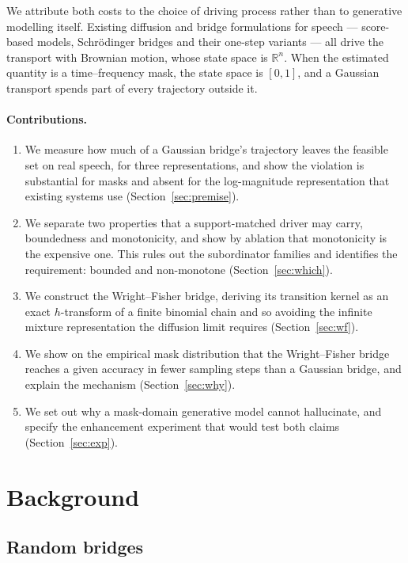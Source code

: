 \documentclass[11pt,a4paper]{article}
\def\R{\mathbb{R}}
\begin{document}
We attribute both costs to the choice of driving process rather than to
generative modelling itself. Existing diffusion and
bridge formulations for speech --- score-based models, Schr\"odinger bridges and
their one-step variants --- all drive the transport with Brownian motion, whose
state space is $\R^n$. When the estimated quantity is a time--frequency mask,
the state space is $[0,1]$, and a Gaussian transport spends part of every
trajectory outside it.

\paragraph{Contributions.}
\begin{enumerate}
\item We measure how much of a Gaussian bridge's trajectory leaves the feasible
set on real speech, for three representations, and show the violation is
substantial for masks and absent for the log-magnitude representation that
existing systems use (Section~\ref{sec:premise}).
\item We separate two properties that a support-matched driver may carry,
boundedness and monotonicity, and show by ablation that monotonicity is the
expensive one. This rules out the subordinator families and identifies the
requirement: bounded and non-monotone (Section~\ref{sec:which}).
\item We construct the Wright--Fisher bridge, deriving its transition kernel as
an exact $h$-transform of a finite binomial chain and so avoiding the infinite
mixture representation the diffusion limit requires
(Section~\ref{sec:wf}).
\item We show on the empirical mask distribution that the Wright--Fisher bridge
reaches a given accuracy in fewer sampling steps than a Gaussian bridge, and
explain the mechanism (Section~\ref{sec:why}).
\item We set out why a mask-domain generative model cannot hallucinate, and
specify the enhancement experiment that would test both claims
(Section~\ref{sec:exp}).
\end{enumerate}

\section{Background}

\subsection{Random bridges}
\end{document}
